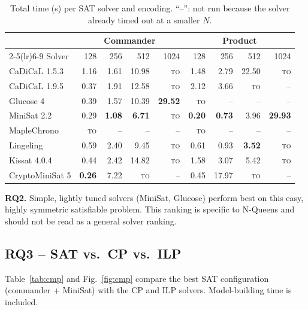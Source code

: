 \documentclass[a4paper,fleqn]{cas-sc}
\newcommand{\TO}{\textsc{to}}
\begin{document}
\begin{table}[pos=htbp]
\caption{Total time (s) per SAT solver and encoding. ``--'': not run because the solver already timed out at a smaller $N$.}\label{tab:solvers}
\centering
\begin{tabular}{lrrrrrrrr}
\toprule
 & \multicolumn{4}{c}{Commander} & \multicolumn{4}{c}{Product} \\
\cmidrule(lr){2-5}\cmidrule(lr){6-9}
Solver & 128 & 256 & 512 & 1024 & 128 & 256 & 512 & 1024 \\
\midrule
CaDiCaL 1.5.3   & 1.16 & 1.61 & 10.98 & \TO & 1.48 & 2.79 & 22.50 & \TO \\
CaDiCaL 1.9.5   & 0.37 & 1.91 & 12.58 & \TO & 2.12 & 3.66 & \TO & -- \\
Glucose 4       & 0.39 & 1.57 & 10.39 & \textbf{29.52} & \TO & -- & -- & -- \\
MiniSat 2.2     & 0.29 & \textbf{1.08} & \textbf{6.71} & \TO & \textbf{0.20} & \textbf{0.73} & 3.96 & \textbf{29.93} \\
MapleChrono     & \TO & -- & -- & -- & \TO & -- & -- & -- \\
Lingeling       & 0.59 & 2.40 & 9.45 & \TO & 0.61 & 0.93 & \textbf{3.52} & \TO \\
Kissat 4.0.4    & 0.44 & 2.42 & 14.82 & \TO & 1.58 & 3.07 & 5.42 & \TO \\
CryptoMiniSat 5 & \textbf{0.26} & 7.22 & \TO & -- & 0.45 & 17.97 & \TO & -- \\
\bottomrule
\end{tabular}
\end{table}

\begin{finding}
\textbf{RQ2.} Simple, lightly tuned solvers (MiniSat, Glucose) perform best on this easy, highly symmetric satisfiable problem. This ranking is specific to N-Queens and should not be read as a general solver ranking.
\end{finding}

\subsection{RQ3 -- SAT vs.\ CP vs.\ ILP}
Table~\ref{tab:cmp} and Fig.~\ref{fig:cmp} compare the best SAT configuration (commander + MiniSat) with the CP and ILP solvers. Model-building time is included.
\end{document}
